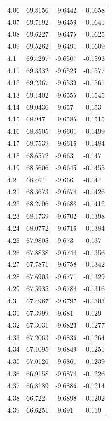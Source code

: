 \begin{tabular}{llll}
4.06 & 69.8156 & -9.6442 & -0.1658 \\
4.07 & 69.7192 & -9.6459 & -0.1641 \\
4.08 & 69.6227 & -9.6475 & -0.1625 \\
4.09 & 69.5262 & -9.6491 & -0.1609 \\
4.1 & 69.4297 & -9.6507 & -0.1593 \\
4.11 & 69.3332 & -9.6523 & -0.1577 \\
4.12 & 69.2367 & -9.6539 & -0.1561 \\
4.13 & 69.1402 & -9.6555 & -0.1545 \\
4.14 & 69.0436 & -9.657 & -0.153 \\
4.15 & 68.947 & -9.6585 & -0.1515 \\
4.16 & 68.8505 & -9.6601 & -0.1499 \\
4.17 & 68.7539 & -9.6616 & -0.1484 \\
4.18 & 68.6572 & -9.663 & -0.147 \\
4.19 & 68.5606 & -9.6645 & -0.1455 \\
4.2 & 68.464 & -9.666 & -0.144 \\
4.21 & 68.3673 & -9.6674 & -0.1426 \\
4.22 & 68.2706 & -9.6688 & -0.1412 \\
4.23 & 68.1739 & -9.6702 & -0.1398 \\
4.24 & 68.0772 & -9.6716 & -0.1384 \\
4.25 & 67.9805 & -9.673 & -0.137 \\
4.26 & 67.8838 & -9.6744 & -0.1356 \\
4.27 & 67.7871 & -9.6758 & -0.1342 \\
4.28 & 67.6903 & -9.6771 & -0.1329 \\
4.29 & 67.5935 & -9.6784 & -0.1316 \\
4.3 & 67.4967 & -9.6797 & -0.1303 \\
4.31 & 67.3999 & -9.681 & -0.129 \\
4.32 & 67.3031 & -9.6823 & -0.1277 \\
4.33 & 67.2063 & -9.6836 & -0.1264 \\
4.34 & 67.1095 & -9.6849 & -0.1251 \\
4.35 & 67.0126 & -9.6861 & -0.1239 \\
4.36 & 66.9158 & -9.6874 & -0.1226 \\
4.37 & 66.8189 & -9.6886 & -0.1214 \\
4.38 & 66.722 & -9.6898 & -0.1202 \\
4.39 & 66.6251 & -9.691 & -0.119 \\

\end{tabular}
